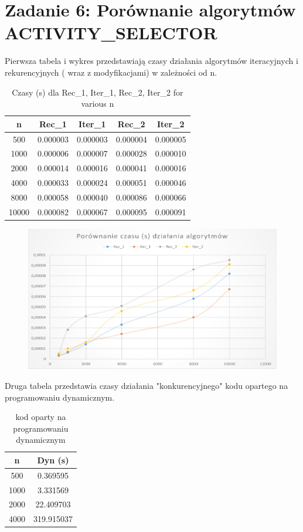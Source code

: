 \documentclass{article}
\theoremstyle{definition}
\begin{document}
	\section{Zadanie 6: Porównanie algorytmów ACTIVITY\_SELECTOR}
	Pierwsza tabela i wykres przedstawiają czasy działania algorytmów iteracyjnych i rekurencyjnych ( wraz z modyfikacjami) w zależności od n.
	\begin{table}[H]
		\centering
		\begin{tabular}{|c|c|c|c|c|}
			\hline
			\textbf{n} & \textbf{Rec\_1} & \textbf{Iter\_1} & \textbf{Rec\_2} & \textbf{Iter\_2} \\ \hline
			500  & 0.000003 & 0.000003 & 0.000004 & 0.000005 \\ \hline
			1000 & 0.000006 & 0.000007 & 0.000028 & 0.000010 \\ \hline
			2000 & 0.000014 & 0.000016 & 0.000041 & 0.000016 \\ \hline
			4000 & 0.000033 & 0.000024 & 0.000051 & 0.000046 \\ \hline
			8000 & 0.000058 & 0.000040 & 0.000086 & 0.000066 \\ \hline
			10000 & 0.000082 & 0.000067 & 0.000095 & 0.000091 \\ \hline
		\end{tabular}
		\caption{Czasy (s) dla Rec\_1, Iter\_1, Rec\_2, Iter\_2 for various n}
	\end{table} 
	\begin{figure}[H]	
		\centering
		\includegraphics[width=1.0\textwidth]{w3.png} 
	\end{figure}
	Druga tabela przedstawia czasy działania "konkurencyjnego" kodu opartego na programowaniu dynamicznym.
	\begin{table}[H]
		\centering
		\begin{tabular}{|c|c|}
			\hline
			\textbf{n} & \textbf{Dyn (s)} \\ \hline
			500  & 0.369595 \\ \hline
			1000 & 3.331569 \\ \hline
			2000 & 22.409703 \\ \hline
			4000 & 319.915037 \\ \hline
		\end{tabular}
		\caption{kod oparty na programowaniu dynamicznym}
	\end{table}
\end{document}
